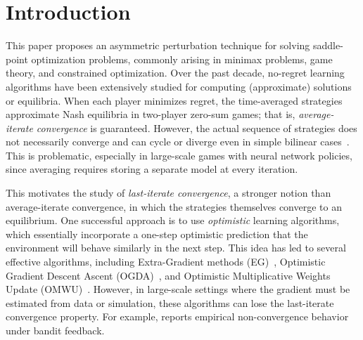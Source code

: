 \documentclass{article}
\theoremstyle{plain}
\begin{document}
\section{Introduction}
\label{sec:introduction}
This paper proposes an asymmetric perturbation technique for solving saddle-point optimization problems, commonly arising in minimax problems, game theory, and constrained optimization.
Over the past decade, no-regret learning algorithms have been extensively studied for computing (approximate) solutions or equilibria.
When each player minimizes regret, the time-averaged strategies approximate Nash equilibria in two-player zero-sum games; that is, \emph{average-iterate convergence} is guaranteed.
However, the actual sequence of strategies does not necessarily converge and can cycle or diverge even in simple bilinear cases~\citep{mertikopoulos2018cycles,bailey2018multiplicative,cheung:colt:2019}.
This is problematic, especially in large-scale games with neural network policies, since averaging requires storing a separate model at every iteration.

This motivates the study of \emph{last-iterate convergence}, a stronger notion than average-iterate convergence, in which the strategies themselves converge to an equilibrium.
One successful approach is to use \emph{optimistic} learning algorithms, which essentially incorporate a one-step optimistic prediction that the environment will behave similarly in the next step.
This idea has led to several effective algorithms, including Extra-Gradient methods (EG)~\citep{liang2019interaction,mokhtari2020unified},
Optimistic Gradient Descent Ascent (OGDA)~\citep{daskalakis2018last,gidel:iclr:2019,mertikopoulos2019learning}, and Optimistic Multiplicative Weights Update (OMWU)~\citep{daskalakis2018last,lei:aistats:2021}.
However, in large-scale settings where the gradient must be estimated from data or simulation, these algorithms can lose the last-iterate convergence property.
For example, \citet{abe2022mutationdriven} reports empirical non-convergence behavior under bandit feedback.
\end{document}
